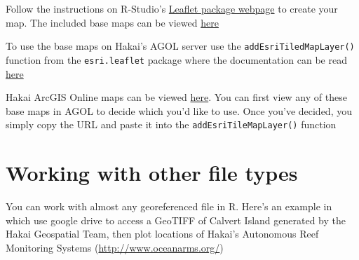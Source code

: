 \documentclass[]{book}
\begin{document}
\hypertarget{htmlwidget-22474e4b02ff188e2adc}{}

Follow the instructions on R-Studio's
\href{https://rstudio.github.io/leaflet/}{Leaflet package webpage} to
create your map. The included base maps can be viewed
\href{https://leaflet-extras.github.io/leaflet-providers/preview/index.html}{here}

To use the base maps on Hakai's AGOL server use the
\texttt{addEsriTiledMapLayer()} function from the \texttt{esri.leaflet}
package where the documentation can be read
\href{https://bhaskarvk.github.io/leaflet.esri/reference/addEsriTiledMapLayer.html}{here}

Hakai ArcGIS Online maps can be viewed
\href{https://ags.hakai.org:6443/arcgis/rest/services/AGOL_basemaps/}{here}.
You can first view any of these base maps in AGOL to decide which you'd
like to use. Once you've decided, you simply copy the URL and paste it
into the \texttt{addEsriTileMapLayer()} function

\section{Working with other file
types}\label{working-with-other-file-types}

You can work with almost any georeferenced file in R. Here's an example
in which use google drive to access a GeoTIFF of Calvert Island
generated by the Hakai Geospatial Team, then plot locations of Hakai's
Autonomous Reef Monitoring Systems (\url{http://www.oceanarms.org/})
\end{document}
